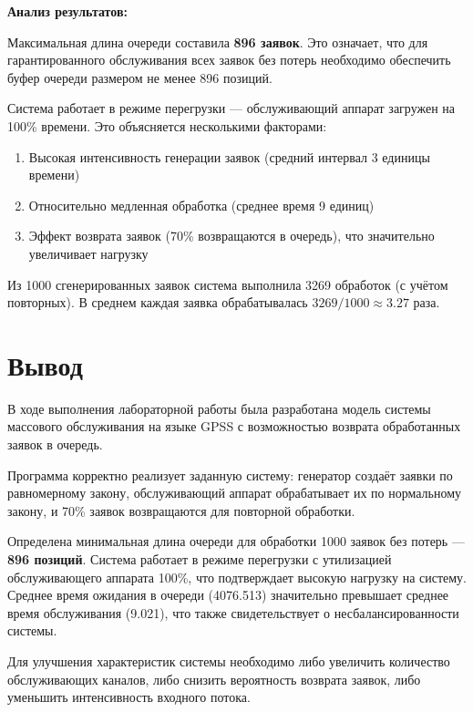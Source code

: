 \textbf{Анализ результатов:}

Максимальная длина очереди составила \textbf{896 заявок}. Это означает, что для гарантированного обслуживания всех заявок без потерь необходимо обеспечить буфер очереди размером не менее 896 позиций.

Система работает в режиме перегрузки — обслуживающий аппарат загружен на 100\% времени. Это объясняется несколькими факторами:

\begin{enumerate}
    \item Высокая интенсивность генерации заявок (средний интервал 3 единицы времени)
    \item Относительно медленная обработка (среднее время 9 единиц)
    \item Эффект возврата заявок (70\% возвращаются в очередь), что значительно увеличивает нагрузку
\end{enumerate}

Из 1000 сгенерированных заявок система выполнила 3269 обработок (с учётом повторных). В среднем каждая заявка обрабатывалась $3269/1000 \approx 3.27$ раза.

\section{Вывод}

В ходе выполнения лабораторной работы была разработана модель системы массового обслуживания на языке GPSS с возможностью возврата обработанных заявок в очередь.

Программа корректно реализует заданную систему: генератор создаёт заявки по равномерному закону, обслуживающий аппарат обрабатывает их по нормальному закону, и 70\% заявок возвращаются для повторной обработки.

Определена минимальная длина очереди для обработки 1000 заявок без потерь — \textbf{896 позиций}. Система работает в режиме перегрузки с утилизацией обслуживающего аппарата 100\%, что подтверждает высокую нагрузку на систему. Среднее время ожидания в очереди (4076.513) значительно превышает среднее время обслуживания (9.021), что также свидетельствует о несбалансированности системы.

Для улучшения характеристик системы необходимо либо увеличить количество обслуживающих каналов, либо снизить вероятность возврата заявок, либо уменьшить интенсивность входного потока.
